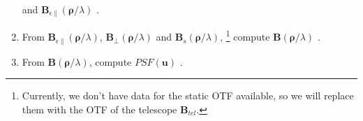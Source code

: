 \documentclass[a4paper]{article}
\begin{document}
\begin{enumerate}
      \cite[eq.~36]{veran} and
      $\mathbf{B}_{\epsilon\parallel}(\boldsymbol{\rho}/\lambda)$
      \cite[eq.~35]{veran}. 
\item From $\mathbf{B}_{\epsilon\parallel}(\boldsymbol{\rho}/\lambda)$,
      $\mathbf{B}_{\perp}(\boldsymbol{\rho}/\lambda)$ and
      $\mathbf{B}_s(\boldsymbol{\rho}/\lambda)$,%
      \footnote{Currently, we don't have data for the static OTF
                available, so we will replace them with the OTF of the
                telescope $\mathbf{B}_{tel}$.}
      compute $\mathbf{B}(\boldsymbol{\rho}/\lambda)$ \cite[eq.~38]{veran}.
\item From $\mathbf{B}(\boldsymbol{\rho}/\lambda)$, compute
      $\mathit{PSF}(\mathbf{u})$ \cite[eq.~28]{veran}.
\end{enumerate}

\noindent
\end{document}
